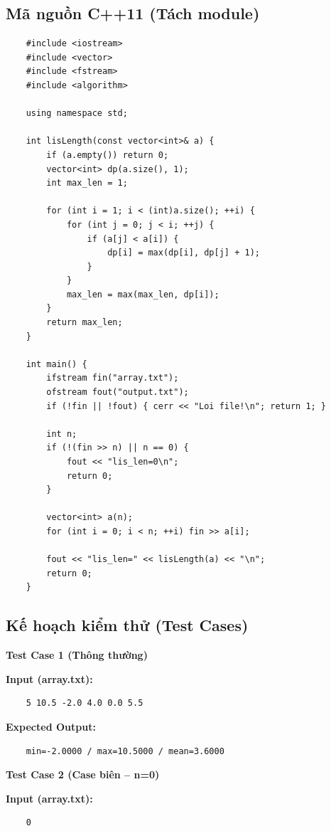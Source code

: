 \subsection{Mã nguồn C++11 (Tách module)}
    \begin{lstlisting}
    #include <iostream>
    #include <vector>
    #include <fstream>
    #include <algorithm>

    using namespace std;

    int lisLength(const vector<int>& a) {
        if (a.empty()) return 0;
        vector<int> dp(a.size(), 1);
        int max_len = 1;
        
        for (int i = 1; i < (int)a.size(); ++i) {
            for (int j = 0; j < i; ++j) {
                if (a[j] < a[i]) {
                    dp[i] = max(dp[i], dp[j] + 1);
                }
            }
            max_len = max(max_len, dp[i]);
        }
        return max_len;
    }

    int main() {
        ifstream fin("array.txt");
        ofstream fout("output.txt");
        if (!fin || !fout) { cerr << "Loi file!\n"; return 1; }

        int n; 
        if (!(fin >> n) || n == 0) {
            fout << "lis_len=0\n";
            return 0;
        }

        vector<int> a(n);
        for (int i = 0; i < n; ++i) fin >> a[i];

        fout << "lis_len=" << lisLength(a) << "\n";
        return 0;
    }
\end{lstlisting}

\subsection{Kế hoạch kiểm thử (Test Cases)}

    \textbf{Test Case 1 (Thông thường)}

    \textbf{Input (array.txt):}
    \begin{lstlisting}
    5 10.5 -2.0 4.0 0.0 5.5\end{lstlisting}

    \textbf{Expected Output:}
    \begin{lstlisting}
    min=-2.0000 / max=10.5000 / mean=3.6000\end{lstlisting}

    \vspace{0.5cm}

    \textbf{Test Case 2 (Case biên -- n=0)}

    \textbf{Input (array.txt):}
    \begin{lstlisting}
    0\end{lstlisting}

